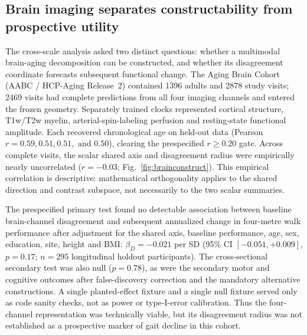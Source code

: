 \documentclass[11pt]{article}
\begin{document}
\subsection{Brain imaging separates constructability from prospective utility}
\label{sec:neuro}

The cross-scale analysis asked two distinct questions: whether a multimodal
brain-aging decomposition can be constructed, and whether its disagreement
coordinate forecasts subsequent functional change. The Aging Brain Cohort
(AABC / HCP-Aging Release~2) contained \num{1396} adults and \num{2878} study
visits; \num{2469} visits had complete predictions from all four imaging channels
and entered the frozen geometry. Separately trained clocks represented cortical
structure, T1w/T2w myelin, arterial-spin-labeling perfusion and resting-state
functional amplitude. Each recovered chronological age on held-out data
(Pearson $r=\num{0.59}, \num{0.51}, \num{0.51}, \text{ and } \num{0.50}$), clearing
the prespecified $r\ge\num{0.20}$ gate. Across complete visits, the scalar shared
axis and disagreement radius were empirically nearly uncorrelated
($r=-\num{0.03}$; Fig.~\ref{fig:brainconstruct}). This empirical correlation
is descriptive: mathematical orthogonality applies to the shared direction and
contrast subspace, not necessarily to the two scalar summaries.

The prespecified primary test found no detectable association between baseline
brain-channel disagreement and subsequent annualized change in four-metre walk
performance after adjustment for the shared axis, baseline performance, age, sex, education,
site, height and BMI: $\beta_D=-\num{0.021}$ per SD (95\% CI
$[-\num{0.051},+\num{0.009}]$, $p=\num{0.17}$; $n=\num{295}$ longitudinal
holdout participants). The cross-sectional secondary test was also null
($p=\num{0.78}$), as were the secondary motor and cognitive outcomes after
false-discovery correction and the mandatory alternative constructions. A
single planted-effect fixture and a single null fixture served only as code
sanity checks, not as power or type-I-error calibration. Thus the four-channel
representation was technically viable, but its disagreement radius was not
established as a prospective marker of gait decline in this cohort.
\end{document}
